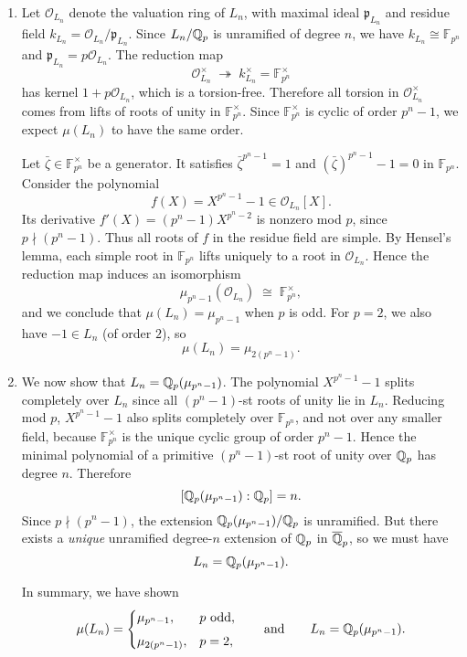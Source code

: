 \documentclass[12pt]{article}  %
\begin{document}
\begin{solution}
\begin{enumerate}
    \item 
Let $\mathcal{O}_{L_n}$ denote the valuation ring of $L_n$, with maximal ideal $\mathfrak{p}_{L_n}$ and residue field $k_{L_n}=\mathcal{O}_{L_n}/\mathfrak{p}_{L_n}$. Since $L_n/\mathbb{Q}_p$ is unramified of degree $n$, we have $k_{L_n}\cong\mathbb{F}_{p^n}$ and $\mathfrak{p}_{L_n}=p\mathcal{O}_{L_n}$. The reduction map
\[
\mathcal{O}_{L_n}^\times \;\twoheadrightarrow\; k_{L_n}^\times=\mathbb{F}_{p^n}^\times
\]
has kernel $1+p\mathcal{O}_{L_n}$, which is a torsion-free. Therefore all torsion in $\mathcal{O}_{L_n}^\times$ comes from lifts of roots of unity in $\mathbb{F}_{p^n}^\times$. Since $\mathbb{F}_{p^n}^\times$ is cyclic of order $p^n-1$, we expect $\mu(L_n)$ to have the same order.

Let $\bar{\zeta}\in\mathbb{F}_{p^n}^\times$ be a generator. It satisfies $\bar{\zeta}^{p^n-1}=1$ and $(\bar{\zeta})^{p^n-1}-1=0$ in $\mathbb{F}_{p^n}$. Consider the polynomial
\[
f(X)=X^{p^n-1}-1\in\mathcal{O}_{L_n}[X].
\]
Its derivative $f'(X)=(p^n-1)X^{p^n-2}$ is nonzero mod $p$, since $p\nmid(p^n-1)$. Thus all roots of $f$ in the residue field are simple. By Hensel's lemma, each simple root in $\mathbb{F}_{p^n}$ lifts uniquely to a root in $\mathcal{O}_{L_n}$. Hence the reduction map induces an isomorphism
\[
\mu_{p^n-1}(\mathcal{O}_{L_n})\;\cong\;\mathbb{F}_{p^n}^\times,
\]
and we conclude that $\mu(L_n)=\mu_{p^n-1}$ when $p$ is odd. For $p=2$, we also have $-1\in L_n$ (of order $2$), so
\[
\mu(L_n)=\mu_{2(p^n-1)}.
\]

\item We now show that $L_n=\mathbb{Q}_p(\mu_{p^n-1})$. The polynomial $X^{p^n-1}-1$ splits completely over $L_n$ since all $(p^n-1)$-st roots of unity lie in $L_n$. Reducing mod $p$, $X^{p^n-1}-1$ also splits completely over $\mathbb{F}_{p^n}$, and not over any smaller field, because $\mathbb{F}_{p^n}^\times$ is the unique cyclic group of order $p^n-1$. Hence the minimal polynomial of a primitive $(p^n-1)$-st root of unity over $\mathbb{Q}_p$ has degree $n$. Therefore
\[
[\mathbb{Q}_p(\mu_{p^n-1}):\mathbb{Q}_p]=n.
\]
Since $p\nmid(p^n-1)$, the extension $\mathbb{Q}_p(\mu_{p^n-1})/\mathbb{Q}_p$ is unramified. But there exists a \emph{unique} unramified degree-$n$ extension of $\mathbb{Q}_p$ in $\overline{\mathbb{Q}}_p$, so we must have
\[
L_n=\mathbb{Q}_p(\mu_{p^n-1}).
\]

In summary, we have shown
\[
\mu(L_n)=
\begin{cases}
\mu_{p^n-1}, & p\text{ odd},\\[4pt]
\mu_{2(p^n-1)}, & p=2,
\end{cases}
\qquad\text{and}\qquad
L_n=\mathbb{Q}_p(\mu_{p^n-1}).
\]
\end{enumerate}
\end{solution}
\end{document}
